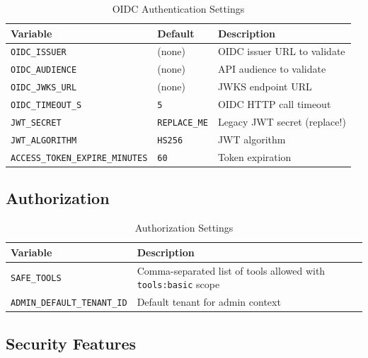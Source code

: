 \begin{table}[ht]
\centering
\caption{OIDC Authentication Settings}
\label{tab:config-oidc}
\small
\begin{tabularx}{\textwidth}{llX}
    \hline
    \textbf{Variable} & \textbf{Default} & \textbf{Description} \\
    \hline
    \texttt{OIDC\_ISSUER} & (none) & OIDC issuer URL to validate \\
    \texttt{OIDC\_AUDIENCE} & (none) & API audience to validate \\
    \texttt{OIDC\_JWKS\_URL} & (none) & JWKS endpoint URL \\
    \texttt{OIDC\_TIMEOUT\_S} & \texttt{5} & OIDC HTTP call timeout \\
    \texttt{JWT\_SECRET} & \texttt{REPLACE\_ME} & Legacy JWT secret (replace!) \\
    \texttt{JWT\_ALGORITHM} & \texttt{HS256} & JWT algorithm \\
    \texttt{ACCESS\_TOKEN\_EXPIRE\_MINUTES} & \texttt{60} & Token expiration \\
    \hline
\end{tabularx}
\end{table}

\subsection{Authorization}

\begin{table}[ht]
\centering
\caption{Authorization Settings}
\label{tab:config-authz}
\small
\begin{tabularx}{\textwidth}{lX}
    \hline
    \textbf{Variable} & \textbf{Description} \\
    \hline
    \texttt{SAFE\_TOOLS} & Comma-separated list of tools allowed with \texttt{tools:basic} scope \\
    \texttt{ADMIN\_DEFAULT\_TENANT\_ID} & Default tenant for admin context \\
    \hline
\end{tabularx}
\end{table}

\subsection{Security Features}

